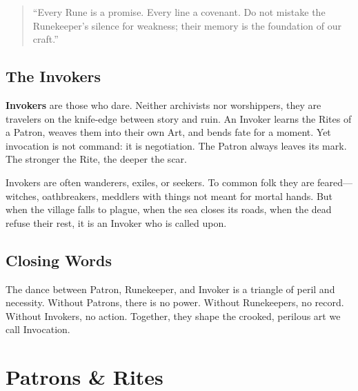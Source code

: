 \begin{quote}
``Every Rune is a promise. Every line a covenant. Do not mistake the Runekeeper’s silence for weakness; their memory is the foundation of our craft.''
\end{quote}

\subsection{The Invokers}

\textbf{Invokers} are those who dare. Neither archivists nor worshippers, they are travelers on the knife-edge between story and ruin. An Invoker learns the Rites of a Patron, weaves them into their own Art, and bends fate for a moment. Yet invocation is not command: it is negotiation. The Patron always leaves its mark. The stronger the Rite, the deeper the scar.

Invokers are often wanderers, exiles, or seekers. To common folk they are feared---witches, oathbreakers, meddlers with things not meant for mortal hands. But when the village falls to plague, when the sea closes its roads, when the dead refuse their rest, it is an Invoker who is called upon.

\subsection*{Closing Words}
The dance between Patron, Runekeeper, and Invoker is a triangle of peril and necessity. Without Patrons, there is no power. Without Runekeepers, no record. Without Invokers, no action. Together, they shape the crooked, perilous art we call Invocation.

\section{Patrons \& Rites}
\label{sec:patrons-rites}


\newcommand{\PatronGift}[2]{%
\paragraph{Patron's Gift (Imbuement).}
Once per scene as an action (cost: 1 Boon; requires \textbf{Thiasos}), touch an item to imbue it until scene end with \textbf{+1 Melee} and \textbf{+1 #1}. \emph{Push It:} extend one more scene by marking \textbf{+1 Obligation}. Gifts from the same Patron don’t stack; take the best. Dice bonuses respect the +3 cap. \textit{Domain:} #2.
}

